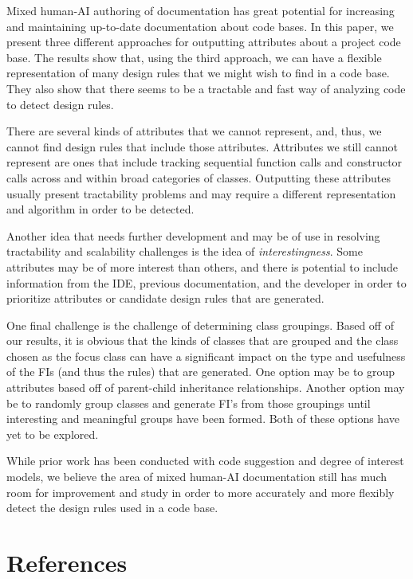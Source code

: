 \documentclass[12pt]{article}
\begin{document}
Mixed human-AI authoring of documentation has great potential for increasing and maintaining up-to-date documentation about code bases. In this paper, we present three different approaches for outputting attributes about a project code base. The results show that, using the third approach, we can have a flexible representation of many design rules that we might wish to find in a code base. They also show that there seems to be a tractable and fast way of analyzing code to detect design rules.

There are several kinds of attributes that we cannot represent, and, thus, we cannot find design rules that include those attributes. Attributes we still cannot represent are ones that include tracking sequential function calls and constructor calls across and within broad categories of classes. Outputting these attributes usually present tractability problems and may require a different representation and algorithm in order to be detected.

Another idea that needs further development and may be of use in resolving tractability and scalability challenges is the idea of \textit{interestingness}. Some attributes may be of more interest than others, and there is potential to include information from the IDE, previous documentation, and the developer in order to prioritize attributes or candidate design rules that are generated.

One final challenge is the challenge of determining class groupings. Based off of our results, it is obvious that the kinds of classes that are grouped and the class chosen as the focus class can have a significant impact on the type and usefulness of the FIs (and thus the rules) that are generated. One option may be to group attributes based off of parent-child inheritance relationships. Another option may be to randomly group classes and generate FI's from those groupings until interesting and meaningful groups have been formed. Both of these options have yet to be explored.

While prior work has been conducted with code suggestion and degree of interest models, we believe the area of mixed human-AI documentation still has much room for improvement and study in order to more accurately and more flexibly detect the design rules used in a code base.


\clearpage

\section{References}\label{references}

\printbibliography
\end{document}
